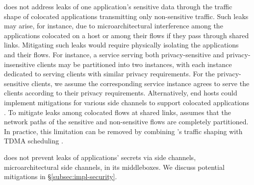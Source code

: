 {\sys} does not address leaks of one application's sensitive data through the
traffic shape of colocated applications transmitting only non-sensitive traffic.
Such leaks may arise, for instance, due to microarchitectural interference among
the applications colocated on a host or among their flows if they pass through
shared links. Mitigating such leaks would require physically isolating the
applications and their flows. For instance, a service serving both
privacy-sensitive and privacy-insensitive clients may be partitioned into two
instances, with each instance dedicated to serving clients with similar privacy
requirements. For the privacy-sensitive clients, we assume the corresponding
service instance agrees to serve the clients according to their privacy
requirements. Alternatively, end hosts could implement mitigations for various
side channels to support colocated applications \cite{mehta2022pacer,
page05partitionedcache, shi2011limiting, kim2012stealthmem,
varadarajan2014scheduler, braun2015robust}. To mitigate leaks among colocated flows at shared
links, {\sys} assumes that the network paths of the sensitive and non-sensitive
flows are completely partitioned. In practice, this limitation can be removed by
combining {\sys}’s traffic shaping with TDMA scheduling \cite{beams2021ifs,
vattikonda2012tdma}.

{\sys} does not prevent leaks of applications' secrets via side channels, \eg
microarchitectural side channels, in its middleboxes. We discuss potential
mitigations in \S\ref{subsec:impl-security}.


